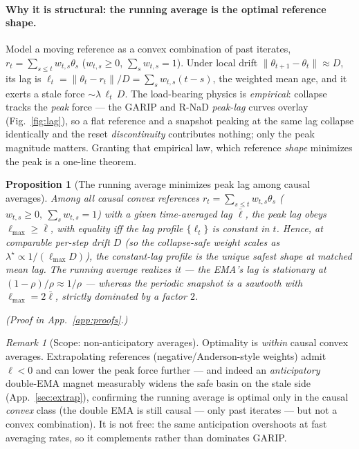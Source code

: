 \documentclass[10pt,twocolumn]{article}
\theoremstyle{plain}
\newtheorem{proposition}{Proposition}
\theoremstyle{remark}
\newtheorem{remark}{Remark}
\begin{document}
\paragraph{Why it is structural: the running average is the optimal reference
shape.} Model a moving reference as a convex combination of past iterates,
$r_t=\sum_{s\le t}w_{t,s}\theta_s$ ($w_{t,s}\!\ge\!0$, $\sum_s w_{t,s}\!=\!1$). Under
local drift $\lVert\theta_{t+1}-\theta_t\rVert\!\approx\!D$, its lag is
$\ell_t=\lVert\theta_t-r_t\rVert/D=\sum_s w_{t,s}(t-s)$, the weighted mean age, and
it exerts a stale force $\sim\!\lambda\,\ell_t\,D$. The load-bearing physics is
\emph{empirical}: collapse tracks the \emph{peak} force --- the GARIP and R-NaD
\emph{peak-lag} curves overlay (Fig.~\ref{fig:lag}), so a flat reference and a
snapshot peaking at the same lag collapse identically and the reset
\emph{discontinuity} contributes nothing; only the peak magnitude matters. Granting
that empirical law, which reference \emph{shape} minimizes the peak is a one-line
theorem.

\begin{proposition}[The running average minimizes peak lag among causal averages]
\label{prop:peakmin}
Among all \emph{causal convex} references $r_t=\sum_{s\le t}w_{t,s}\theta_s$
($w_{t,s}\!\ge\!0,\ \sum_s w_{t,s}\!=\!1$) with a given time-averaged lag $\bar\ell$,
the peak lag obeys $\ell_{\max}\ge\bar\ell$, with equality iff the lag profile
$\{\ell_t\}$ is constant in $t$. Hence, at comparable per-step drift $D$ (so the
collapse-safe weight scales as $\lambda^\star\!\propto\!1/(\ell_{\max}D)$), the
constant-lag profile is the unique safest \emph{shape} at matched mean lag. The
running average realizes it --- the EMA's lag is stationary at
$(1-\rho)/\rho\!\approx\!1/\rho$ --- whereas the periodic snapshot is a sawtooth with
$\ell_{\max}=2\bar\ell$, strictly dominated by a factor $2$.
\end{proposition}
\noindent\emph{(Proof in App.~\ref{app:proofs}.)}

\begin{remark}[Scope: non-anticipatory averages]
\label{rem:causal}
Optimality is \emph{within} causal convex averages. Extrapolating references
(negative/Anderson-style weights) admit $\ell\!<\!0$ and can lower the peak force
further --- and indeed an \emph{anticipatory} double-EMA magnet measurably widens
the safe basin on the stale side (App.~\ref{sec:extrap}), confirming the running
average is optimal only in the causal \emph{convex} class (the double EMA is still
causal --- only past iterates --- but not a convex combination). It is not free: the
same anticipation overshoots at fast averaging rates, so it complements rather than
dominates GARIP.
\end{remark}
\end{document}
